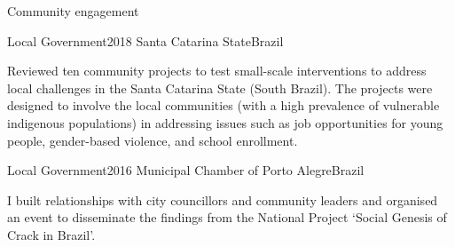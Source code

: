 \begin{rSection}{Community engagement}

\begin{rSubsection}
{Local Government}{2018}
{Santa Catarina State}{Brazil}\par
{Reviewed ten community projects to test small-scale interventions to address local challenges in the Santa Catarina State (South Brazil). The projects were designed to involve the local communities (with a high prevalence of vulnerable indigenous populations) in addressing issues such as job opportunities for young people, gender-based violence, and school enrollment.}
\end{rSubsection}

\vspace{1em}

\begin{rSubsection}
{Local Government}{2016}
{Municipal Chamber of Porto Alegre}{Brazil}\par
{I built relationships with city councillors and community leaders and organised an event to disseminate the findings from the National Project `Social Genesis of Crack in Brazil'.}
\end{rSubsection}

\end{rSection}
